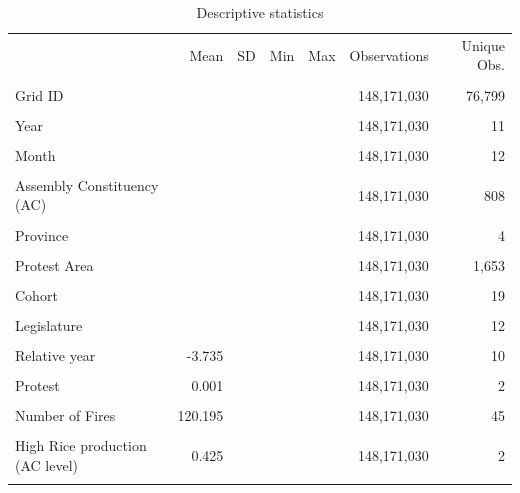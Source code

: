 \begin{table}[!h]
\centering
\caption{Descriptive statistics}
\label{app_desc_10_5km_protest}
\begin{tabular}{lrrrrrr}
\toprule
 & Mean & SD & Min & Max & Observations & Unique Obs.\\\\
\midrule
Grid ID &  &  &  &  & 148,171,030 & 76,799\\\\
Year &  &  &  &  & 148,171,030 & 11\\\\
Month &  &  &  &  & 148,171,030 & 12\\\\
Assembly Constituency (AC) &  &  &  &  & 148,171,030 & 808\\\\
Province &  &  &  &  & 148,171,030 & 4\\\\
Protest Area &  &  &  &  & 148,171,030 & 1,653\\\\
Cohort &  &  &  &  & 148,171,030 & 19\\\\
Legislature &  &  &  &  & 148,171,030 & 12\\\\
Relative year & -3.735 &  &  &  & 148,171,030 & 10\\\\
Protest & 0.001 &  &  &  & 148,171,030 & 2\\\\
Number of Fires & 120.195 &  &  &  & 148,171,030 & 45\\\\
High Rice production (AC level) & 0.425 &  &  &  & 148,171,030 & 2\\\\
\bottomrule
\end{tabular}
\end{table}
